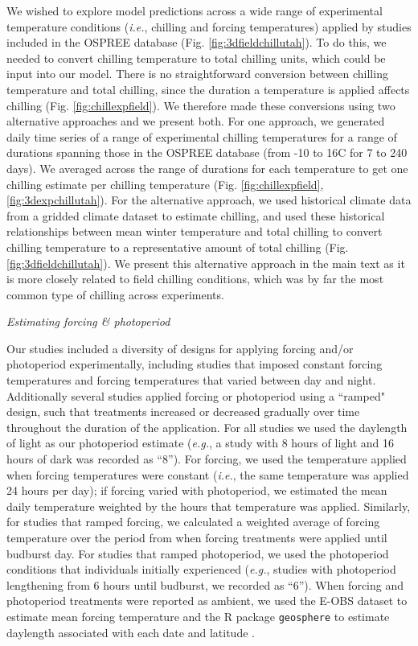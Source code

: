 \documentclass{article}
\begin{document}
\par We wished to explore model predictions across a wide range of experimental temperature conditions (\emph{i.e.}, chilling and forcing temperatures) applied by studies included in the OSPREE database (Fig. \ref{fig:3dfieldchillutah}). To do this, we needed to convert chilling temperature to total chilling units, which could be input into our model. There is no straightforward conversion between chilling temperature and total chilling, since the duration a temperature is applied affects chilling (Fig. \ref{fig:chillexpfield}). We therefore made these conversions using two alternative approaches and we present both. For one approach, we generated daily time series of a range of experimental chilling temperatures for a range of durations spanning those in the OSPREE database (from -10 to 16\degree C for 7 to 240 days). We averaged across the range of durations for each temperature to get one chilling estimate per chilling temperature (Fig. \ref{fig:chillexpfield}, \ref{fig:3dexpchillutah}). For the alternative approach, we used historical climate data from a gridded climate dataset \emph{\citep[{\normalfont E-OBS},][]{cornes2018}} to estimate chilling, and used these historical relationships between mean winter temperature and total chilling to  convert chilling temperature to a representative amount of total chilling (Fig. \ref{fig:3dfieldchillutah}). We present this alternative approach in the main text as it is more closely related to field chilling conditions, which was by far the most common type of chilling across experiments.

\par{\emph{Estimating forcing \& photoperiod}}

Our studies included a diversity of designs for applying forcing and/or photoperiod experimentally, including studies that imposed constant forcing temperatures and forcing temperatures that varied between day and night.  Additionally several studies applied forcing or photoperiod using a ``ramped" design, such that treatments increased or decreased gradually over time throughout the duration of the application. For all studies we used the daylength of light as our photoperiod estimate (\emph{e.g.}, a study with 8 hours of light and 16 hours of dark was recorded as ``8''). For forcing, we used the temperature applied when forcing temperatures were constant (\emph{i.e.}, the same temperature was applied 24 hours per day); if forcing varied with photoperiod, we estimated the mean daily temperature weighted by the hours that temperature was applied. Similarly, for studies that ramped forcing, we calculated a weighted average of forcing temperature over the period from when forcing treatments were applied until budburst day. For studies that ramped photoperiod, we used the photoperiod conditions that individuals initially experienced (\emph{e.g.}, studies with photoperiod lengthening from 6 hours until budburst, we recorded as ``6''). When forcing and photoperiod treatments were reported as ambient, we used the E-OBS  dataset to estimate mean forcing temperature and the R package \texttt{geosphere} to estimate daylength associated with each  date and latitude \emph{\citep{cornes2018}}. 
\end{document}
